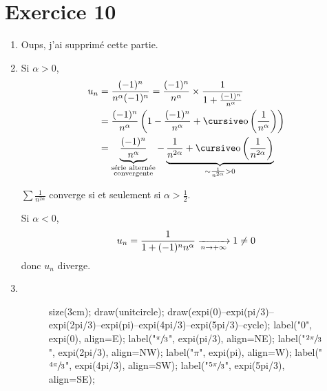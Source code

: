 \part{Exercice 10}

\begin{enumerate}
	\item Oups, j'ai supprimé cette partie.
	\item
		Si $\alpha > 0$,
		\begin{align*}
			u_n &= \frac{(-1)^n}{n^{\alpha} (-1)^n} = \frac{(-1)^n}{n^\alpha} \times \frac{1}{1 + \frac{(-1)^n}{n^\alpha}}\\
			&= \frac{(-1)^n}{n^\alpha} \left( 1 - \frac{(-1)^n}{n^\alpha} + \po\left( \frac{1}{n^\alpha} \right) \right) \\
			&= \underbrace{\frac{(-1)^n}{n^\alpha}}_{\substack{\text{série alternée}\\\text{convergente}}} - \underbrace{\frac{1}{n^{2\alpha}} + \po\left( \frac{1}{n^{2\alpha}} \right)}_{\sim \frac{1}{n^{2\alpha}} > 0} \\
		\end{align*}

		$\sum \frac{1}{n^{2\alpha}}$ converge si et seulement si $\alpha > \frac{1}{2}$.

		Si $\alpha < 0$, \[
			u_n = \frac{1}{1+(-1)^n n^\alpha} \xrightarrow[n\to +\infty]{} 1 \neq 0
		\] donc $u_n$ diverge.
	\item~\\
		\begin{figure}[H]
			\centering
			\begin{asy}
				size(3cm);
				draw(unitcircle);
				draw(expi(0)--expi(pi/3)--expi(2pi/3)--expi(pi)--expi(4pi/3)--expi(5pi/3)--cycle);
				label("$0$", expi(0), align=E);
				label("$\sfrac{\pi}{3}$", expi(pi/3), align=NE);
				label("$\sfrac{2\pi}{3}$", expi(2pi/3), align=NW);
				label("$\pi$", expi(pi), align=W);
				label("$\sfrac{4\pi}{3}$", expi(4pi/3), align=SW);
				label("$\sfrac{5\pi}{3}$", expi(5pi/3), align=SE);
			\end{asy}
		\end{figure}


\end{enumerate}

